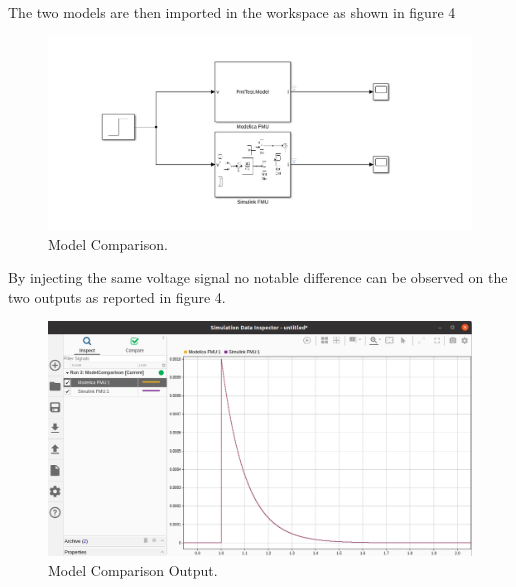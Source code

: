 \newline
\newline
The two models are then imported in the workspace as shown in figure 4
\newline
\begin{figure}[ht]
\centering
\includegraphics[width=1.0\textwidth]{ModelComparison.png}
\caption{\label{fig:ModelComparison}Model Comparison.}
\end{figure}

By injecting the same voltage signal no notable difference can be observed on the two outputs as reported in figure 4.
\newline
\begin{figure}[ht]
\centering
\includegraphics[width=1.0\textwidth]{ModelComparisonOutput.png}
\caption{\label{fig:ModelComparison}Model Comparison Output.}
\end{figure}
\newpage
